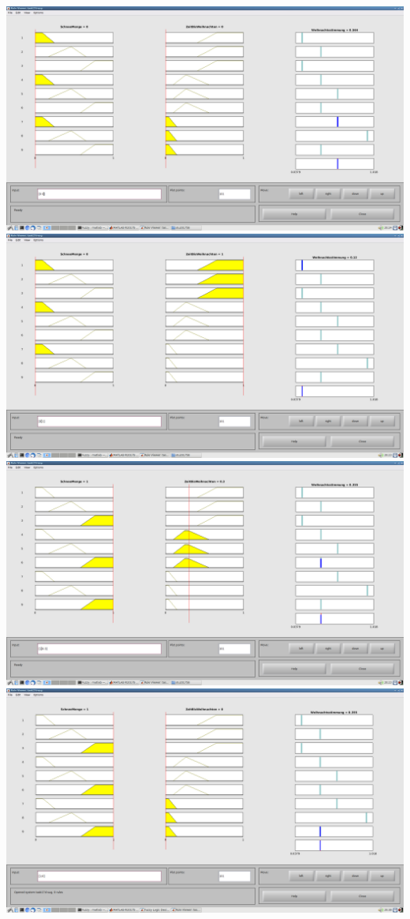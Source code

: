 \includegraphics[width=\textwidth]{part/screenshots/fuzzy-17d-0-0}
\includegraphics[width=\textwidth]{part/screenshots/fuzzy-17d-0-1}
\includegraphics[width=\textwidth]{part/screenshots/fuzzy-17d-1-0,3}
\includegraphics[width=\textwidth]{part/screenshots/fuzzy-17d-1-0}
